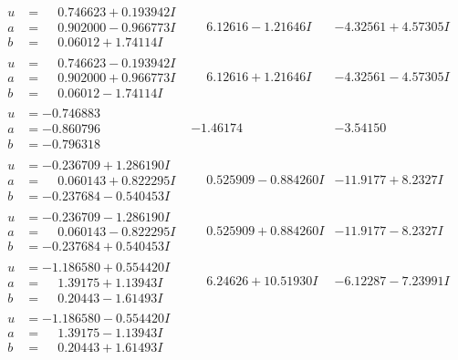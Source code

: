 \documentclass[1p]{elsarticle_modified}
\theoremstyle{definition}
\begin{document}
$$\begin{array}{c|c|c}
\begin{aligned}
u &= \phantom{-}0.746623 + 0.193942 I \\
a &= \phantom{-}0.902000 - 0.966773 I \\
b &= \phantom{-}0.06012 + 1.74114 I\end{aligned}
 & \phantom{-}6.12616 - 1.21646 I & -4.32561 + 4.57305 I \\ \hline\begin{aligned}
u &= \phantom{-}0.746623 - 0.193942 I \\
a &= \phantom{-}0.902000 + 0.966773 I \\
b &= \phantom{-}0.06012 - 1.74114 I\end{aligned}
 & \phantom{-}6.12616 + 1.21646 I & -4.32561 - 4.57305 I \\ \hline\begin{aligned}
u &= -0.746883\phantom{ +0.000000I} \\
a &= -0.860796\phantom{ +0.000000I} \\
b &= -0.796318\phantom{ +0.000000I}\end{aligned}
 & -1.46174\phantom{ +0.000000I} & -3.54150\phantom{ +0.000000I} \\ \hline\begin{aligned}
u &= -0.236709 + 1.286190 I \\
a &= \phantom{-}0.060143 + 0.822295 I \\
b &= -0.237684 - 0.540453 I\end{aligned}
 & \phantom{-}0.525909 - 0.884260 I & -11.9177 + 8.2327 I \\ \hline\begin{aligned}
u &= -0.236709 - 1.286190 I \\
a &= \phantom{-}0.060143 - 0.822295 I \\
b &= -0.237684 + 0.540453 I\end{aligned}
 & \phantom{-}0.525909 + 0.884260 I & -11.9177 - 8.2327 I \\ \hline\begin{aligned}
u &= -1.186580 + 0.554420 I \\
a &= \phantom{-}1.39175 + 1.13943 I \\
b &= \phantom{-}0.20443 - 1.61493 I\end{aligned}
 & \phantom{-}6.24626 + 10.51930 I & -6.12287 - 7.23991 I \\ \hline\begin{aligned}
u &= -1.186580 - 0.554420 I \\
a &= \phantom{-}1.39175 - 1.13943 I \\
b &= \phantom{-}0.20443 + 1.61493 I\end{aligned}

\end{array}$$
\end{document}
